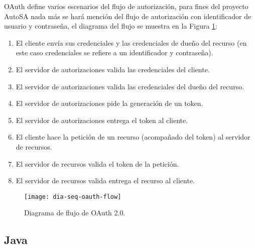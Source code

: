 OAuth define varios escenarios del flujo de autorización, para fines del proyecto AutoSA nada más se hará mención del flujo de autorización con identificador de usuario y contraseña\cite{OAuthRFC, OAuth2Identity}, el diagrama del flujo se muestra en la Figura \ref{fig:dia-seq-oauth-flow}:
\begin{enumerate}
	\item El cliente envía sus credenciales y las credenciales de dueño del recurso (en este caso credenciales se refiere a un identificador y contraseña).
	\item El servidor de autorizaciones valida las credenciales del cliente.
	\item El servidor de autorizaciones valida las credenciales del dueño del recurso.
	\item El servidor de autorizaciones pide la generación de un token.
	\item El servidor de autorizaciones entrega el token al cliente.
	\item El cliente hace la petición de un recurso (acompañado del token) al servidor de recursos.
	\item El servidor de recursos valida el token de la petición. 
	\item El servidor de recursos valida entrega el recurso al cliente.
\end{enumerate}

\begin{figure}[h]
	\centering
	\texttt{[image: dia-seq-oauth-flow]}
	\caption{Diagrama de flujo de OAuth 2.0.}
	\label{fig:dia-seq-oauth-flow}
\end{figure}

\subsection{Java}\label{sec-java}

